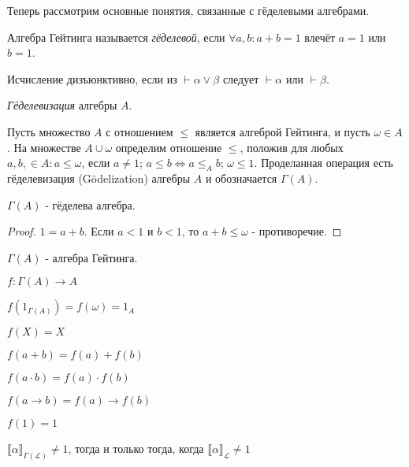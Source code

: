 Теперь рассмотрим основные понятия, связанные с гёделевыми алгебрами.

\begin{definition}
Алгебра Гейтинга называется \emph{гёделевой}, если $\forall a, b: a + b = 1$
	влечёт $a = 1$ или $b = 1$.
\end{definition}

\begin{definition}
Исчисление дизъюнктивно, если из $\vdash \alpha \lor \beta$ следует $\vdash \alpha$
или $\vdash \beta$.
\end{definition}

\begin{definition}
\emph{Гёделевизация} алгебры $A$.


Пусть множество $A$ с отношением $\leq$ является алгеброй Гейтинга, 
и пусть $\omega \in A$. На множестве $A \cup {\omega}$
определим отношение $\leq$, положив для любых $a, b, \in A: a \leq \omega$,
если $a \neq 1$; $a \leq b \iff a \leq_{A} b$; $\omega \leq 1$. Проделанная операция есть гёделевизация
(Gödelization) алгебры $A$ и обозначается $\Gamma(A)$.
\end{definition}

\begin{lemma}
$\Gamma(A)$ - гёделева алгебра.
\end{lemma}

\begin{proof}
$1 = a + b$. Если $a < 1$ и $b < 1$, то $a + b \leq \omega$ - противоречие.
\end{proof}

\begin{lemma}
$\Gamma(A)$ - алгебра Гейтинга.
\end{lemma}

\begin{definition}

$f: \Gamma(A) \rightarrow A$

$f(1_{\Gamma(A)}) = f(\omega) = 1_{A}$

$f(X) = X$
\end{definition}

\begin{lemma}

$f(a + b) = f(a) + f(b)$

$f(a \cdot b) = f(a) \cdot f(b)$

$f(a \rightarrow b) = f(a) \rightarrow f(b)$

$f(1) = 1$
\end{lemma}

\begin{lemma}
${\llbracket \alpha \rrbracket}_{\Gamma(\mathcal{L})} \neq 1$, тогда и только тогда, когда 
${\llbracket \alpha \rrbracket}_{\mathcal{L}} \neq 1$
\end{lemma}

